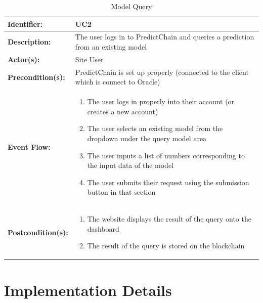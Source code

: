 \documentclass{article}
\begin{document}
    \begin{table}[H]
        \caption{Model Query}
        \label{tab:model-query}
        \centering
        \begin{tabular}{|p{3cm}|p{12cm}|}
            \hline
            \textbf{Identifier:} & UC2 \\
            \hline
            \textbf{Description:} & The user logs in to PredictChain and queries a prediction from an existing model\\
            \hline
            \textbf{Actor(s):} & Site User \\
            \hline
            \textbf{Precondition(s):} & PredictChain is set up properly (connected to the client which is connect to Oracle) \\
            \hline
            \textbf{Event Flow:} &
            \begin{enumerate}
                \item The user logs in properly into their account (or creates a new account)
                \item The user selects an existing model from the dropdown under the query model area
                \item The user inputs a list of numbers corresponding to the input data of the model
                \item The user submits their request using the submission button in that section
            \end{enumerate} \\
            \hline
            \textbf{Postcondition(s):} &
            \begin{enumerate}
                \item The website displays the result of the query onto the dashboard
                \item The result of the query is stored on the blockchain
            \end{enumerate}\\
            \hline
        \end{tabular}
    \end{table}

    \section{Implementation Details}

\end{document}
